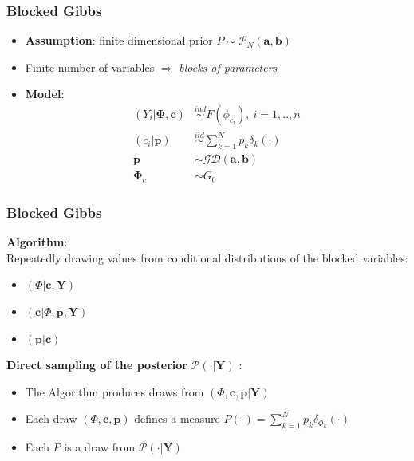 \begin{frame} %
	\frametitle{Blocked Gibbs}
	\begin{itemize}
	    \item \textbf{Assumption}: finite dimensional prior  $P \sim  \mathscr{P}_{N}(\textbf{a},\textbf{b})$
	
        \item Finite number of variables $\Rightarrow$ \textit{blocks of parameters} \\
        \item \textbf{Model}:\\
        \begin{align*}
            (Y_{i}|\mathbf{\Phi},\mathbf{c})&\stackrel{ind}{\sim} F(\phi_{c_{i}}) , \ i=1,..,n \\
            (c_{i}|\mathbf{p})&\stackrel{iid}{\sim}\sum\limits_{k=1}^N \mathit{p_{k}}\delta_{k}(\cdot)\\
            \mathbf{p} &\sim \mathscr{GD}(\textbf{a},\textbf{b}) \\
            \mathbf{\Phi}_{c} & \sim G_{0}
        \end{align*}



	\end{itemize}
\end{frame}




\begin{frame} %
	\frametitle{Blocked Gibbs}
\textbf{Algorithm}: \\
Repeatedly drawing values from conditional distributions of the blocked variables:\\

\begin{itemize}
    \item $(\Phi | \textbf{c}, \textbf{Y})$
    \item $(\textbf{c}| \Phi,\textbf{p}, \textbf{Y})$
    \item $(\textbf{p}| \textbf{c})$

\end{itemize}

\textbf{Direct sampling of the posterior} $\mathscr{P}(\cdot|\mathbf{Y})$ :\\

\begin{itemize}
    \item The Algorithm produces draws from $(\Phi,\textbf{c},\textbf{p}| \textbf{Y})$ \\
\item Each draw $(\Phi,\textbf{c},\textbf{p})$ defines a measure $P(\cdot)= \sum\limits_{k=1}^N  \mathit{p_{k}}\delta_{\Phi_{k}}(\cdot) $
\item Each $P$ is a draw from $\mathscr{P}(\cdot|\mathbf{Y})$
\end{itemize}




\end{frame}

